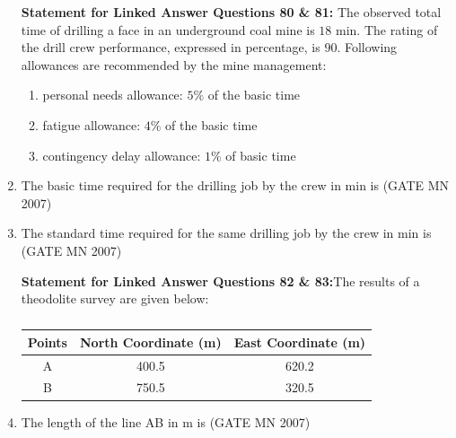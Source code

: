 \documentclass[journal]{IEEEtran}
\begin{document}
\begin{enumerate}
\textbf{Statement for Linked Answer Questions 80 \& 81:} The observed total time of drilling a face in an underground coal mine is $18$ min. The rating of the drill crew performance, expressed in percentage, is $90$.  
Following allowances are recommended by the mine management:
\begin{enumerate}
\item personal needs allowance: $5\%$ of the basic time
\item fatigue allowance: $4\%$ of the basic time
\item contingency delay allowance: $1\%$ of basic time
\end{enumerate}

\item The basic time required for the drilling job by the crew in min is
	\hfill (GATE MN 2007)
\begin{enumerate}
\end{enumerate}

\item The standard time required for the same drilling job by the crew in min is
	\hfill (GATE MN 2007)
\begin{enumerate}
\end{enumerate}
\textbf{Statement for Linked Answer Questions 82 \& 83:}The results of a theodolite survey are given below:  

\begin{table}[H]
    \centering\normalsize
\begin{tabular}{|c|c|c|}
\hline
Points & North Coordinate (m) & East Coordinate (m) \\
\hline
A & 400.5 & 620.2 \\
\hline
B & 750.5 & 320.5 \\
\hline
\end{tabular}
    \caption{}
	\label{tab:Q82&Q83}
\end{table}
\item The length of the line AB in m is 
	\hfill (GATE MN 2007)
\begin{enumerate}
\end{enumerate}


\end{enumerate}
\end{document}
